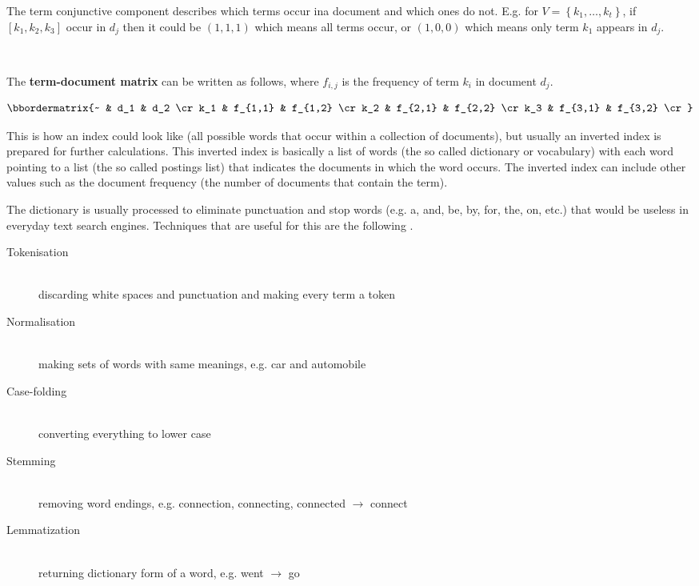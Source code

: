 The term conjunctive component describes which terms occur ina  document and which ones do not. E.g. for $V =\left \{k_{1},\ldots, k_{t}\right \}$, if $\left [ k_{1},k_{2},k_{3} \right ]$ occur in $d_{j}$ then it could be $\left ( 1,1,1 \right )$ which means all terms occur, or $\left ( 1,0,0 \right )$ which means only term $k_{1}$ appears in $d_{j}$.

 \\
 

The \textbf{term-document matrix} can be written as follows, where $f_{i,j}$ is the frequency of term $k_{i}$ in document $d_{j}$.

\begin{equation}
\label{eq:tdm}
\bbordermatrix{~ & d_1 & d_2 \cr
              k_1 & f_{1,1} & f_{1,2} \cr
              k_2 & f_{2,1} & f_{2,2} \cr
              k_3 & f_{3,1} & f_{3,2} \cr}
\end{equation}

This is how an index could look like (all possible words that occur within a collection of documents), but usually an inverted index is prepared for further calculations. This inverted index is basically a list of words (the so called dictionary or vocabulary) with each word pointing to a list (the so called postings list) that indicates the documents in which the word occurs. The inverted index can include other values such as the document frequency (the number of documents that contain the term).

The dictionary is usually processed to eliminate punctuation and stop words (e.g. a, and, be, by, for, the, on, etc.) that would be useless in everyday text search engines. Techniques that are useful for this are the following \citep[Ch.2]{Manning2009}.

\begin{description}
\item [Tokenisation] \hfill \\
discarding white spaces and punctuation and making every term a token
\item [Normalisation] \hfill \\
making sets of words with same meanings, e.g. car and automobile
\item [Case-folding] \hfill \\
converting everything to lower case
\item [Stemming] \hfill \\
removing word endings, e.g. connection, connecting, connected $\to$ connect
\item [Lemmatization] \hfill \\
returning dictionary form of a word, e.g. went $\to$ go
\end{description}

